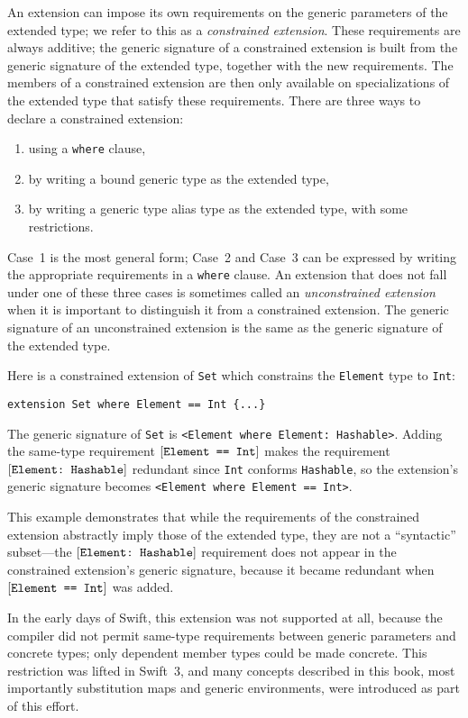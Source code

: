 \documentclass[../generics]{subfiles}
\begin{document}
An extension can impose its own requirements on the generic parameters of the extended type; we refer to this as a \emph{constrained extension}. These requirements are always additive; the generic signature of a constrained extension is built from the generic signature of the extended type, together with the new requirements. The members of a constrained extension are then only available on specializations of the extended type that satisfy these requirements. There are three ways to declare a constrained extension:
\begin{enumerate}
\item using a \texttt{where} clause,
\item by writing a bound generic type as the extended type,
\item by writing a generic type alias type as the extended type, with some restrictions.
\end{enumerate}
Case~1 is the most general form; Case~2 and Case~3 can be expressed by writing the appropriate requirements in a \texttt{where} clause. An extension that does not fall under one of these three cases is sometimes called an \emph{unconstrained extension} when it is important to distinguish it from a constrained extension. The generic signature of an unconstrained extension is the same as the generic signature of the extended type. 

Here is a constrained extension of \texttt{Set} which constrains the \texttt{Element} type to \texttt{Int}:
\begin{Verbatim}
extension Set where Element == Int {...}
\end{Verbatim}
The generic signature of \texttt{Set} is \verb|<Element where Element: Hashable>|. Adding the same-type requirement $[\texttt{Element == Int}]$ makes the requirement $[\texttt{Element:~Hashable}]$ redundant since \texttt{Int} conforms \texttt{Hashable}, so the extension's generic signature becomes \verb|<Element where Element == Int>|.

This example demonstrates that while the requirements of the constrained extension abstractly imply those of the extended type, they are not a ``syntactic'' subset---the $[\texttt{Element:~Hashable}]$ requirement does not appear in the constrained extension's generic signature, because it became redundant when $[\texttt{Element == Int}]$ was added.

In the early days of Swift, this extension was not supported at all, because the compiler did not permit same-type requirements between generic parameters and concrete types; only dependent member types could be made concrete. This restriction was lifted in Swift~3, and many concepts described in this book, most importantly substitution maps and generic environments, were introduced as part of this effort.
\end{document}
